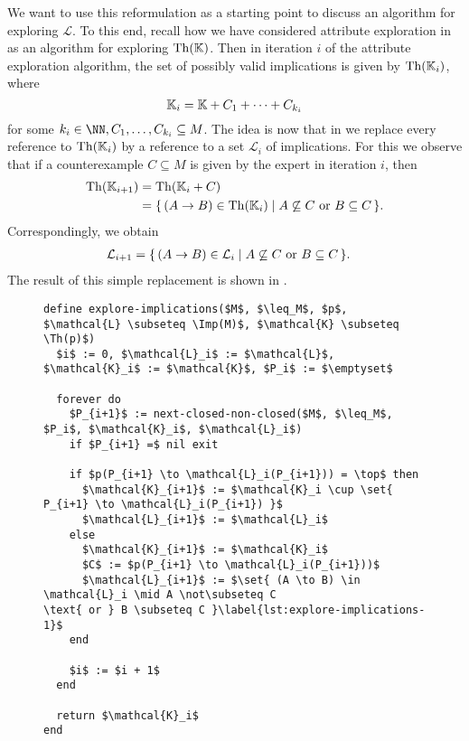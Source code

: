 We want to use this reformulation as a starting point to discuss an algorithm for
exploring $\mathcal{L}$.  To this end, recall how we have considered attribute exploration
in  as an algorithm for exploring $\operatorname{Th}({\mathbb{K}})$.  Then in
iteration $i$ of the attribute exploration algorithm, the set of possibly valid
implications is given by $\operatorname{Th}({\mathbb{K}}_{i})$, where
\begin{equation*}
  {\ensuremath{\mathbb{K}}}_{i} = {\mathbb{K}} + C_{1} + \dots + C_{k_{i}}
\end{equation*}
for some $k_{i} \in \NN, C_{1}, \dots, C_{k_{i}} \subseteq M$.  The idea is now that in
 we replace every reference to
$\operatorname{Th}({\mathbb{K}}_{i})$ by a reference to a set $\mathcal{L}_{i}$ of implications.  For this we
observe that if a counterexample $C \subseteq M$ is given by the expert in iteration $i$,
then
\begin{align*}
  \operatorname{Th}({\mathbb{K}}_{i+1})
  &= \operatorname{Th}({\mathbb{K}}_{i} + C) \\
  &= {\{\, (A \to B) \in \operatorname{Th}({\mathbb{K}}_{i}) \mid A \not\subseteq C \text{ or } B \subseteq C \,\}}.
\end{align*}
Correspondingly, we obtain
\begin{align*}
  \mathcal{L}_{i+1}
  &= {\{\, (A \to B) \in \mathcal{L}_{i} \mid A \not\subseteq C \text{ or } B \subseteq C \,\}}.
\end{align*}
The result of this simple replacement is shown in .


\begin{figure}[tp]
  \centering
  \begin{Algorithm}
    \label{alg:explore-implications}
    \hspace*{0cm}
\begin{lstlisting}
define explore-implications($M$, $\leq_M$, $p$, $\mathcal{L} \subseteq \Imp(M)$, $\mathcal{K} \subseteq \Th(p)$)
  $i$ := 0, $\mathcal{L}_i$ := $\mathcal{L}$, $\mathcal{K}_i$ := $\mathcal{K}$, $P_i$ := $\emptyset$

  forever do
    $P_{i+1}$ := next-closed-non-closed($M$, $\leq_M$, $P_i$, $\mathcal{K}_i$, $\mathcal{L}_i$)
    if $P_{i+1} =$ nil exit

    if $p(P_{i+1} \to \mathcal{L}_i(P_{i+1})) = \top$ then
      $\mathcal{K}_{i+1}$ := $\mathcal{K}_i \cup \set{ P_{i+1} \to \mathcal{L}_i(P_{i+1}) }$
      $\mathcal{L}_{i+1}$ := $\mathcal{L}_i$
    else
      $\mathcal{K}_{i+1}$ := $\mathcal{K}_i$
      $C$ := $p(P_{i+1} \to \mathcal{L}_i(P_{i+1}))$
      $\mathcal{L}_{i+1}$ := $\set{ (A \to B) \in \mathcal{L}_i \mid A \not\subseteq C
\text{ or } B \subseteq C }\label{lst:explore-implications-1}$
    end

    $i$ := $i + 1$
  end

  return $\mathcal{K}_i$  
end
\end{lstlisting}
  \end{Algorithm}
\end{figure}

